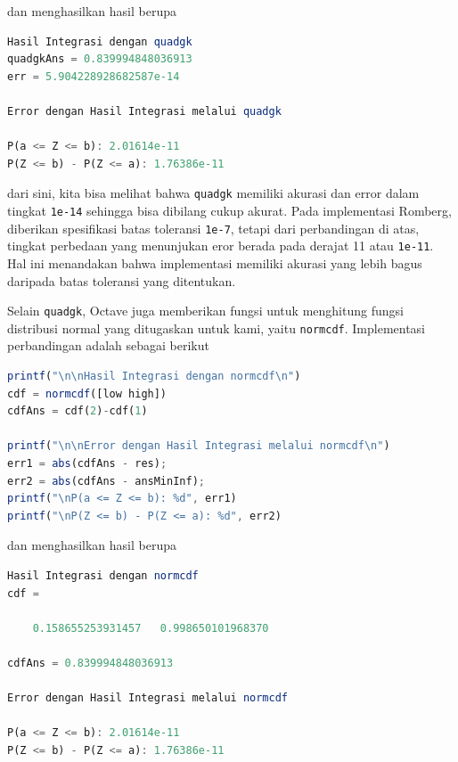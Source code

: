 \documentclass[journal,12pt,onecolumn,a4paper]{IEEEtran}
\begin{document}
dan menghasilkan hasil berupa

\begin{center}
	\begin{lstlisting}[language=Octave]
Hasil Integrasi dengan quadgk
quadgkAns = 0.839994848036913
err = 5.904228928682587e-14

Error dengan Hasil Integrasi melalui quadgk

P(a <= Z <= b): 2.01614e-11
P(Z <= b) - P(Z <= a): 1.76386e-11
	\end{lstlisting}
\end{center}

dari sini, kita bisa melihat bahwa \lstinline{quadgk} memiliki akurasi dan error dalam tingkat \lstinline{1e-14} sehingga bisa dibilang cukup akurat. Pada implementasi Romberg, diberikan spesifikasi batas toleransi \lstinline{1e-7}, tetapi dari perbandingan di atas, tingkat perbedaan yang menunjukan eror berada pada derajat 11 atau \lstinline{1e-11}.
Hal ini menandakan bahwa implementasi memiliki akurasi yang lebih bagus daripada batas toleransi yang ditentukan.

Selain \lstinline{quadgk}, Octave juga memberikan fungsi untuk menghitung fungsi distribusi normal yang ditugaskan untuk kami, yaitu \lstinline{normcdf}. Implementasi perbandingan adalah sebagai berikut

\begin{center}
	\begin{lstlisting}[language=Octave]
printf("\n\nHasil Integrasi dengan normcdf\n")
cdf = normcdf([low high])
cdfAns = cdf(2)-cdf(1)

printf("\n\nError dengan Hasil Integrasi melalui normcdf\n")
err1 = abs(cdfAns - res);
err2 = abs(cdfAns - ansMinInf);
printf("\nP(a <= Z <= b): %d", err1)
printf("\nP(Z <= b) - P(Z <= a): %d", err2)
	\end{lstlisting}
\end{center}

dan menghasilkan hasil berupa

\begin{center}
	\begin{lstlisting}[language=Octave]
Hasil Integrasi dengan normcdf
cdf =

	0.158655253931457   0.998650101968370

cdfAns = 0.839994848036913

Error dengan Hasil Integrasi melalui normcdf

P(a <= Z <= b): 2.01614e-11
P(Z <= b) - P(Z <= a): 1.76386e-11
	\end{lstlisting}
\end{center}
\end{document}
